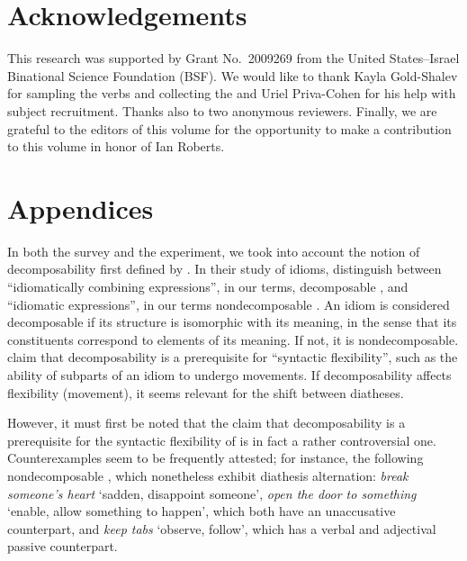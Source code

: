 \documentclass[output=paper]{langsci/langscibook}
\begin{document}
\printchapterglossary{}

\section*{Acknowledgements}

This research was supported by Grant No.\ 2009269 from the United States–Israel
Binational Science Foundation (BSF). We would like to thank Kayla Gold-Shalev
for sampling the verbs and collecting the  and Uriel Priva-Cohen for his
help with subject recruitment. Thanks also to two anonymous reviewers. Finally,
we are grateful to the editors of this volume for the opportunity to make a
contribution to this volume in honor of Ian Roberts.

{\sloppy
\printbibliography[heading=subbibliography,notkeyword=this]
}

\section*{Appendices}

In both the survey and the experiment, we took into account the notion of
decomposability first defined by \textcite{NunSagWas1994}. In their study of
idioms, \citeauthor{NunSagWas1994} distinguish between ``idiomatically combining
expressions'', in our terms, decomposable , and ``idiomatic expressions'',
in our terms nondecomposable . An idiom is considered decomposable if its
structure is isomorphic with its meaning, in the sense that its constituents
correspond to elements of its meaning. If not, it is nondecomposable.
\textcite{NunSagWas1994} claim that decomposability is a prerequisite for
``syntactic flexibility'', such as the ability of subparts of an idiom to
undergo movements.  If decomposability affects flexibility (movement), it seems
relevant for the shift between diatheses.

However, it must first be noted that the claim that decomposability is a
prerequisite for the syntactic flexibility of  is in fact a rather
controversial one. Counterexamples seem to be frequently attested; for
instance, the following nondecomposable , which nonetheless exhibit
diathesis alternation: \emph{break someone’s heart} ‘sadden, disappoint
someone’, \emph{open the door to something} ‘enable, allow something to
happen', which both have an unaccusative counterpart, and \emph{keep tabs}
‘observe, follow’, which has a verbal and adjectival passive
counterpart.
\end{document}
